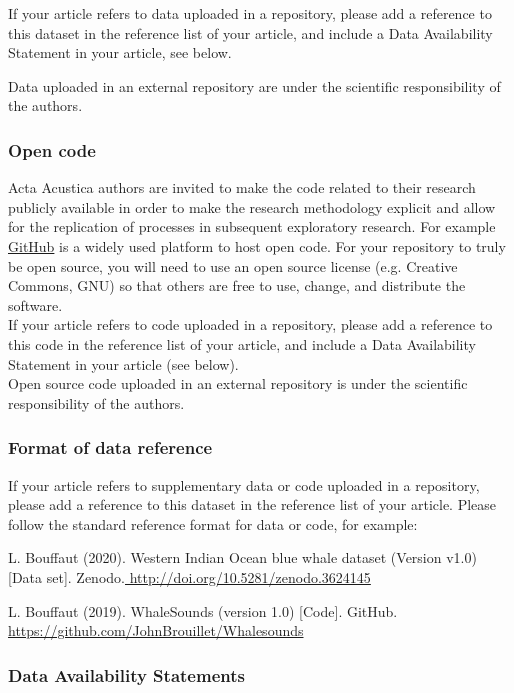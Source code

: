 If your article refers to data uploaded in a repository, please add
a reference to this dataset in the reference list of your article,
and include a Data Availability Statement in your article, see below.

Data uploaded in an external repository are under the scientific responsibility
of the authors.

\subsubsection{Open code }

Acta Acustica authors are invited to make the code related to their
research publicly available in order to make the research methodology
explicit and allow for the replication of processes in subsequent
exploratory research. For example \href{https://github.com/}{GitHub}
is a widely used platform to host open code. For your repository to
truly be open source, you will need to use an open source license
(e.g. Creative Commons, GNU) so that others are free to use, change,
and distribute the software.\\

If your article refers to code uploaded in a repository, please add
a reference to this code in the reference list of your article, and
include a Data Availability Statement in your article (see below).\\

Open source code uploaded in an external repository is under the scientific
responsibility of the authors.

\subsubsection{Format of data reference}

If your article refers to supplementary data or code uploaded in a
repository, please add a reference to this dataset in the reference
list of your article. Please follow the standard reference format
for data or code, for example:

L. Bouffaut (2020). Western Indian Ocean blue whale dataset (Version
v1.0) {[}Data set{]}. Zenodo.\href{}{ http://doi.org/10.5281/zenodo.3624145 }

L. Bouffaut (2019). WhaleSounds (version 1.0) {[}Code{]}. GitHub.
\href{https://github.com/JohnBrouillet/Whalesounds}{https://github.com/JohnBrouillet/Whalesounds} 

\subsubsection{Data Availability Statements }

